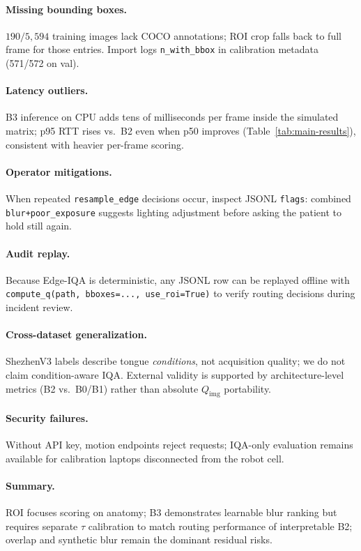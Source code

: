 \paragraph{Missing bounding boxes.}
$190/5{,}594$ training images lack COCO annotations; ROI crop falls back to full frame for those entries.
Import logs \texttt{n\_with\_bbox} in calibration metadata (571/572 on val).

\paragraph{Latency outliers.}
B3 inference on CPU adds tens of milliseconds per frame inside the simulated matrix; p95 RTT rises vs.\ B2 even when p50 improves (Table~\ref{tab:main-results}), consistent with heavier per-frame scoring.

\paragraph{Operator mitigations.}
When repeated \texttt{resample\_edge} decisions occur, inspect JSONL \texttt{flags}: combined \texttt{blur+poor\_exposure} suggests lighting adjustment before asking the patient to hold still again.

\paragraph{Audit replay.}
Because Edge-IQA is deterministic, any JSONL row can be replayed offline with \texttt{compute\_q(path, bboxes=..., use\_roi=True)} to verify routing decisions during incident review.

\paragraph{Cross-dataset generalization.}
ShezhenV3 labels describe tongue \emph{conditions}, not acquisition quality; we do not claim condition-aware IQA.
External validity is supported by architecture-level metrics (B2 vs.\ B0/B1) rather than absolute $Q_{\mathrm{img}}$ portability.

\paragraph{Security failures.}
Without API key, motion endpoints reject requests; IQA-only evaluation remains available for calibration laptops disconnected from the robot cell.

\paragraph{Summary.}
ROI focuses scoring on anatomy; B3 demonstrates learnable blur ranking but requires separate $\tau$ calibration to match routing performance of interpretable B2; overlap and synthetic blur remain the dominant residual risks.

